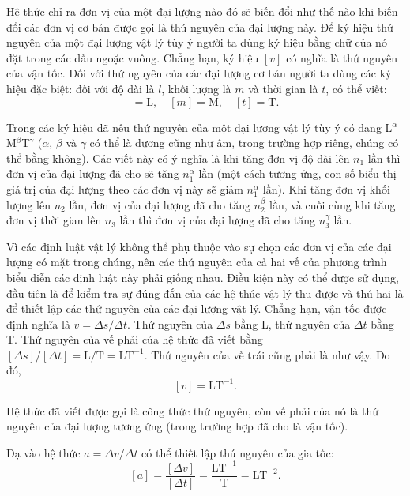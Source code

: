 Hệ thức chỉ ra đơn vị của một đại lượng nào đó sẽ biến đổi như thế nào khi biến đổi các đơn vị cơ bản được gọi là thú nguyên của đại lượng này. Để ký hiệu thứ nguyên của một đại lượng vật lý tùy ý người ta dùng ký hiệu bằng chữ của nó đặt trong các dấu ngoặc vuông. Chẳng hạn, ký hiệu $[v]$ có nghĩa là thứ nguyên của vận tốc. Đối với thứ nguyên của các đại lượng cơ bản người ta dùng các ký hiệu đặc biệt: đối với độ dài là $l$, khối lượng là $m$ và thời gian là $t$, có thể viết:
\begin{equation*}
[l] = \text{L},\quad [m] = \text{M},\quad [t] = \text{T}.
\end{equation*}

Trong các ký hiệu đã nêu thứ nguyên của một đại lượng vật lý tùy ý có dạng L$^{\alpha}$M$^{\beta}$T$^{\gamma}$ ($\alpha$, $\beta$ và $\gamma$ có thể là dương cũng như âm, trong trường hợp riêng, chúng có thể bằng không). Các viết này có ý nghĩa là khi tăng đơn vị độ dài lên $n_1$ lần thì đơn vị của đại lượng đã cho sẽ tăng $n_1^{\alpha}$ lần (một cách tương ứng, con số biểu thị giá trị của đại lượng theo các đơn vị này sẽ giảm $n_1^{\alpha}$ lần). Khi tăng đơn vị khối lượng lên $n_2$ lần, đơn vị của đại lượng đã cho tăng $n_2^{\beta}$ lần, và cuối cùng khi tăng đơn vị thời gian lên $n_3$ lần thì đơn vị của đại lượng đã cho tăng $n_3^{\gamma}$ lần.

Vì các định luật vật lý không thể phụ thuộc vào sự chọn các đơn vị của các đại lượng có mặt trong chúng, nên các thứ nguyên của cả hai vế của phương trình biểu diễn các định luật này phải giống nhau. Điều kiện này có thể được sử dụng, đầu tiên là để kiểm tra sự đúng đắn của các hệ thúc vật lý thu được và thú hai là để thiết lập các thứ nguyên của các đại lượng vật lý. Chẳng hạn, vận tốc được định nghĩa là $v = \Delta s/\Delta t$. Thứ nguyên của $\Delta s$ bằng L, thứ nguyên của $\Delta t$ bằng T. Thứ nguyên của vế phải của hệ thức đã viết bằng $[\Delta s]/[\Delta t]=\text{L/T}=\text{LT}^{-1}$. Thứ nguyên của vế trái cũng phải là như vậy. Do đó,
\begin{equation}\label{eq:2_14}
[v] = \text{LT}^{-1}.
\end{equation}

\noindent
Hệ thức đã viết được gọi là công thức thứ nguyên, còn vế phải của nó là thứ nguyên của đại lượng tương ứng (trong trường hợp đã cho là vận tốc).

Dạ vào hệ thức $a = \Delta v/\Delta t$ có thể thiết lập thú nguyên của gia tốc:
\begin{equation}\label{eq:2_15}
[a] = \frac{[\Delta v]}{[\Delta t]} = \frac{\text{LT}^{-1}}{\text{T}} = \text{LT}^{-2}.
\end{equation}

